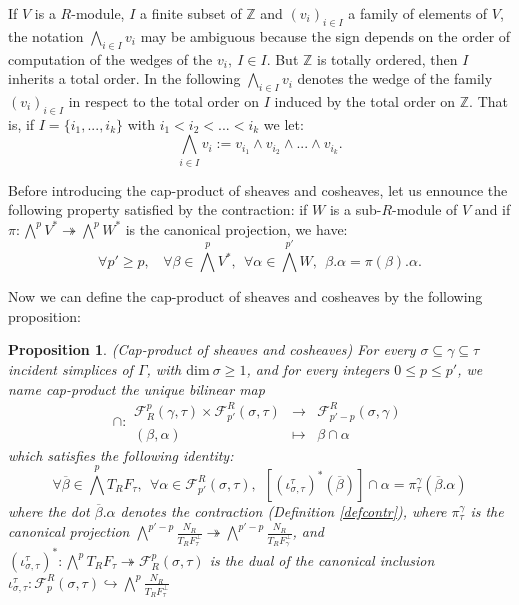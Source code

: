 \documentclass{article}
\newtheorem{proposition}{Proposition}
\begin{document}
If $V$ is a $R$-module, $I$ a finite subset of $\mathbb{Z}$ and $(v_i)_{i\in I}$ a family of elements of $V$, the notation $\bigwedge_{i\in I}v_i$ may be ambiguous because the sign depends on the order of computation of the wedges of the $v_i,~ I\in I$. But $\mathbb{Z}$ is totally ordered, then $I$ inherits a total order. In the following $\bigwedge_{i\in I}v_i$ denotes the wedge of the family $(v_i)_{i\in I}$ in respect to the total order on $I$ induced by the total order on $\mathbb{Z}$. That is, if $I=\{i_1,...,i_k\}$ with $i_1<i_2<...<i_k$ we let:
\begin{equation*}
    \bigwedge_{i \in I}v_i:= v_{i_1}\wedge v_{i_2}\wedge...\wedge v_{i_k}.
\end{equation*}

Before introducing the cap-product of sheaves and cosheaves, let us ennounce the following property satisfied by the contraction: if $W$ is a sub-$R$-module of $V$ and if $\pi: \bigwedge^p V^* \twoheadrightarrow \bigwedge^p W^*$ is the canonical projection, we have:
\begin{equation}
    \forall p'\geq p,~~~~\forall \beta \in \bigwedge^{p} V^*, ~~ \forall \alpha \in \bigwedge^{p'} W, ~~\beta.\alpha = \pi(\beta).\alpha.
    \label{yutr}
\end{equation}

Now we can define the cap-product of sheaves and cosheaves by the following proposition:

\begin{proposition}
    (Cap-product of sheaves and cosheaves) For every $\sigma \subseteq \gamma \subseteq \tau$ incident simplices of $\Gamma$, with $\mathrm{dim}~ \sigma \geq 1$, and for every integers $0\leq p \leq p'$, we name cap-product the unique bilinear map
    \begin{equation*}
        \cap: \begin{array}{rcl}
            \mathcal{F}^{p}_R(\gamma,\tau) \times \mathcal{F}_{p'}^R(\sigma,\tau)  & \rightarrow & \mathcal{F}_{p'-p}^R(\sigma,\gamma)   \\
            (\beta,\alpha) & \mapsto & \beta \cap \alpha
        \end{array}
    \end{equation*}
    which satisfies the following identity:
    \begin{equation*}
        \forall \overline{\beta} \in \bigwedge^p T_RF_{\tau}, ~~ \forall \alpha \in \mathcal{F}_{p'}^R(\sigma,\tau), ~~ [(\iota_{\sigma,\tau}^{\tau})^*(\overline{\beta})] \cap \alpha = \pi_{\tau}^{\gamma}(\overline{\beta}.\alpha)
    \end{equation*}
    where the dot $\overline{\beta}.\alpha$ denotes the contraction (Definition \ref{defcontr}), where $\pi_{\tau}^{\gamma}$ is the canonical projection $\bigwedge^{p'-p}\frac{N_R}{T_RF_{\tau}^{\perp}} \twoheadrightarrow \bigwedge^{p'-p}\frac{N_R}{T_RF_{\gamma}^{\perp}}$, and $(\iota_{\sigma,\tau}^{\tau})^*:\bigwedge^p T_RF_{\tau} \twoheadrightarrow \mathcal{F}^p_R(\sigma,\tau)$ is the dual of the canonical inclusion $\iota_{\sigma,\tau}^{\tau}:\mathcal{F}^R_p(\sigma,\tau) \hookrightarrow \bigwedge^p\frac{N_R}{T_RF_{\tau}^{\perp}}$
    \label{defcap}
\end{proposition}
\end{document}
